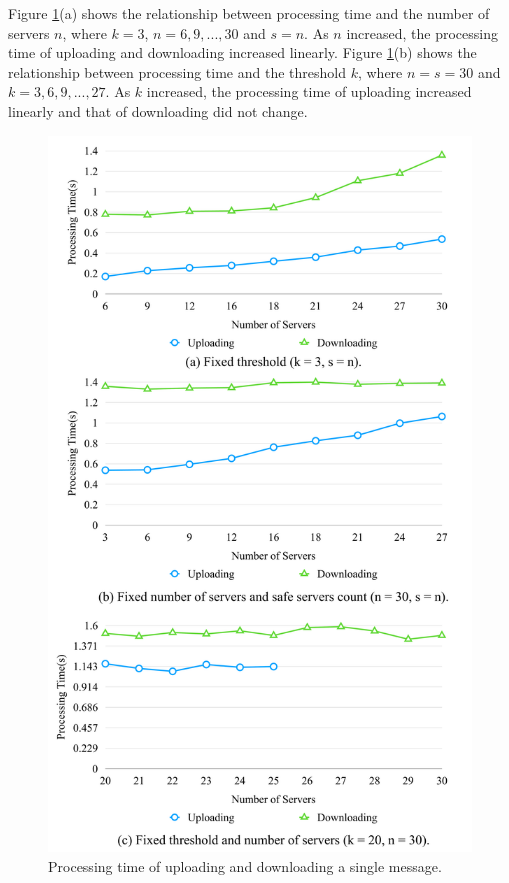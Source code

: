 \documentclass[a4paper,11pt]{report}
\begin{document}
Figure \ref{fig:constant_parameter}(a) shows the relationship between processing time and the number of servers $n$, where ${k=3}$,  ${n = 6, 9, ... , 30}$ and $s = n$.
As $n$ increased, the processing time of uploading and downloading increased linearly. 
Figure \ref{fig:constant_parameter}(b) shows the relationship between processing time and the threshold $k$, where ${n = s =30}$ and ${k = 3, 6, 9, ... , 27}$.
As $k$ increased, the processing time of uploading increased linearly and that of downloading did not change.

\begin{figure}[H]
	\centering
	\includegraphics[scale=0.17]{constant_parameter}
	\caption{Processing time of uploading and downloading a single message.}
	\label{fig:constant_parameter}
\end{figure}
\end{document}
